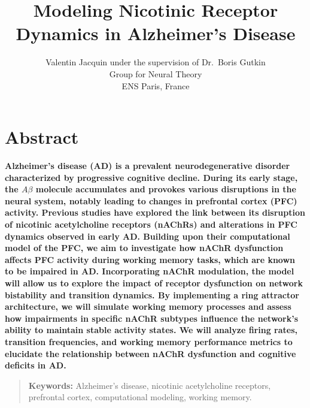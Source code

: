 \documentclass[10pt,letterpaper]{article}
\title{Modeling Nicotinic Receptor Dynamics in Alzheimer's Disease}
\author{
Valentin Jacquin under the supervision of Dr.\ Boris Gutkin \\
Group for Neural Theory \\
ENS Paris, France \\
}
\begin{document}
\maketitle

\section{Abstract}
{\bf
Alzheimer's disease (AD) is a prevalent neurodegenerative disorder characterized by progressive cognitive decline. During its early stage, the $A\beta$ molecule accumulates and provokes various disruptions in the neural system, notably leading to changes in prefrontal cortex (PFC) activity. Previous studies have explored the link between its disruption of nicotinic acetylcholine receptors (nAChRs) and alterations in PFC dynamics observed in early AD. Building upon their computational model of the PFC, we aim to investigate how nAChR dysfunction affects PFC activity during working memory tasks, which are known to be impaired in AD. Incorporating nAChR modulation, the model will allow us to explore the impact of receptor dysfunction on network bistability and transition dynamics. By implementing a ring attractor architecture, we will simulate working memory processes and assess how impairments in specific nAChR subtypes influence the network's ability to maintain stable activity states. We will analyze firing rates, transition frequencies, and working memory performance metrics to elucidate the relationship between nAChR dysfunction and cognitive deficits in AD.
}
\begin{quote}
\small
\textbf{Keywords:} Alzheimer's disease, nicotinic acetylcholine receptors, prefrontal cortex, computational modeling, working memory.
\end{quote}
\end{document}
